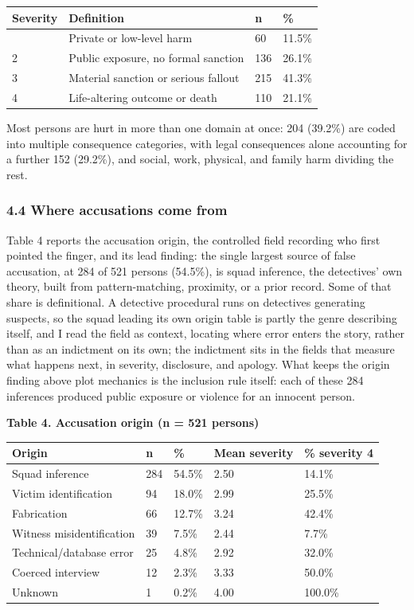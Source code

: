 \documentclass[
]{article}
\newcounter{none} %
\begin{document}
{\def\LTcaptype{none} %
\begin{longtable}[]{@{}llll@{}}
\toprule\noalign{}
Severity & Definition & n & \% \\
\midrule\noalign{}
\endhead
\bottomrule\noalign{}
\endlastfoot
1 & Private or low-level harm & 60 & 11.5\% \\
2 & Public exposure, no formal sanction & 136 & 26.1\% \\
3 & Material sanction or serious fallout & 215 & 41.3\% \\
4 & Life-altering outcome or death & 110 & 21.1\% \\
\end{longtable}
}

Most persons are hurt in more than one domain at once: 204 (39.2\%) are
coded into multiple consequence categories, with legal consequences
alone accounting for a further 152 (29.2\%), and social, work, physical,
and family harm dividing the rest.

\subsubsection{4.4 Where accusations come
from}\label{where-accusations-come-from}

Table 4 reports the accusation origin, the controlled field recording
who first pointed the finger, and its lead finding: the single largest
source of false accusation, at 284 of 521 persons (54.5\%), is squad
inference, the detectives' own theory, built from pattern-matching,
proximity, or a prior record. Some of that share is definitional. A
detective procedural runs on detectives generating suspects, so the
squad leading its own origin table is partly the genre describing
itself, and I read the field as context, locating where error enters the
story, rather than as an indictment on its own; the indictment sits in
the fields that measure what happens next, in severity, disclosure, and
apology. What keeps the origin finding above plot mechanics is the
inclusion rule itself: each of these 284 inferences produced public
exposure or violence for an innocent person.

\textbf{Table 4. Accusation origin (n = 521 persons)}

{\def\LTcaptype{none} %
\begin{longtable}[]{@{}lllll@{}}
\toprule\noalign{}
Origin & n & \% & Mean severity & \% severity 4 \\
\midrule\noalign{}
\endhead
\bottomrule\noalign{}
\endlastfoot
Squad inference & 284 & 54.5\% & 2.50 & 14.1\% \\
Victim identification & 94 & 18.0\% & 2.99 & 25.5\% \\
Fabrication & 66 & 12.7\% & 3.24 & 42.4\% \\
Witness misidentification & 39 & 7.5\% & 2.44 & 7.7\% \\
Technical/database error & 25 & 4.8\% & 2.92 & 32.0\% \\
Coerced interview & 12 & 2.3\% & 3.33 & 50.0\% \\
Unknown & 1 & 0.2\% & 4.00 & 100.0\% \\
\end{longtable}
}
\end{document}
